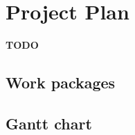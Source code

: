 \chapter{Project Plan}
\label{sec:projectPlan}

\textbf{TODO}

\section{Work packages}



\section{Gantt chart}



%
%
%
